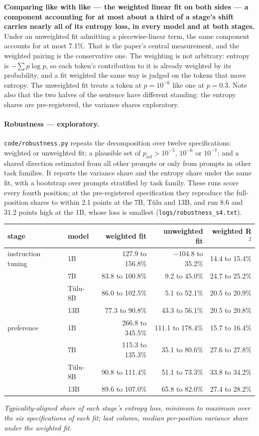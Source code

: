 \documentclass[11pt]{article}
\begin{document}
\textbf{Comparing like with like --- the weighted linear fit on both sides --- a
component accounting for at most about a third of a stage's shift carries nearly all
of its entropy loss, in every model and at both stages.} Under an unweighted fit
admitting a piecewise-linear term, the same component accounts for at most 7.1\%.
That is the paper's central measurement, and the weighted pairing is the
conservative one. The weighting is not arbitrary: entropy is $-\sum p \log p$, so
each token's contribution to it is already weighted by its probability, and a fit
weighted the same way is judged on the tokens that move entropy. The unweighted fit
treats a token at $p = 10^{-6}$ like one at $p = 0.3$. Note also that the two halves
of the sentence have different standing: the entropy shares are pre-registered, the
variance shares exploratory.

\paragraph{Robustness --- exploratory.} \texttt{code/robustness.py} repeats the
decomposition over twelve specifications: weighted or unweighted fit; a plausible
set of $p_{\mathrm{ref}} > 10^{-5}$, $10^{-6}$ or $10^{-7}$; and a shared direction
estimated from all other prompts or only from prompts in other task families. It
reports the variance share and the entropy share under the same fit, with a
bootstrap over prompts stratified by task family. These runs score every fourth
position; at the pre-registered specification they reproduce the full-position
shares to within 2.1 points at the 7B, T\"ulu and 13B, and run 8.6 and 31.2 points
high at the 1B, whose loss is smallest (\texttt{logs/robustness\_s4.txt}).

\begin{center}
\small
\begin{tabular}{llrrr}
\toprule
stage & model & weighted fit & unweighted fit & weighted R$^2$ \\
\midrule
instruction tuning & 1B & 127.9 to 156.8\% & $-$104.8 to 35.2\% & 14.4 to 15.4\% \\
 & 7B & 83.8 to 100.8\% & 9.2 to 45.0\% & 24.7 to 25.2\% \\
 & T\"ulu-8B & 86.0 to 102.5\% & 5.1 to 52.1\% & 20.5 to 20.9\% \\
 & 13B & 77.3 to 90.8\% & 43.3 to 56.1\% & 20.5 to 20.8\% \\
preference & 1B & 266.8 to 345.5\% & 111.1 to 178.4\% & 15.7 to 16.4\% \\
 & 7B & 115.3 to 135.3\% & 35.1 to 80.6\% & 27.6 to 27.8\% \\
 & T\"ulu-8B & 90.8 to 111.4\% & 51.1 to 73.3\% & 33.8 to 34.2\% \\
 & 13B & 89.6 to 107.0\% & 65.8 to 82.0\% & 27.4 to 28.2\% \\
\bottomrule
\end{tabular}

\emph{Typicality-aligned share of each stage's entropy loss, minimum to maximum over
the six specifications of each fit; last column, median per-position variance share
under the weighted fit.}
\end{center}
\end{document}
